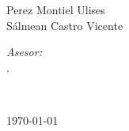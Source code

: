 \documentclass[10pt]{article}
\begin{document}
\begin{center}
\begin{minipage}{0.46\textwidth}
\begin{flushleft}
Perez Montiel Ulises\\
Sálmean Castro Vicente\\
\end{flushleft}                                                                     %
\end{minipage}      
\begin{minipage}{0.52\textwidth}        
\vspace{-0.6cm}                                         %
\begin{flushright} \large                                                           %
\emph{Asesor:} \\                                                                 %
.\\                                             %
\end{flushright}                                                                    %
\end{minipage}  
\vspace*{1cm}
    
        \\                                                                     %
\vspace{2cm}                                                                                
\begin{center}                                                                                  
{\large \today}                                                                 %
            \end{center}                                                                        
\end{center}                                                                        
                                                                                    
\newpage                                                                        
\end{document}

